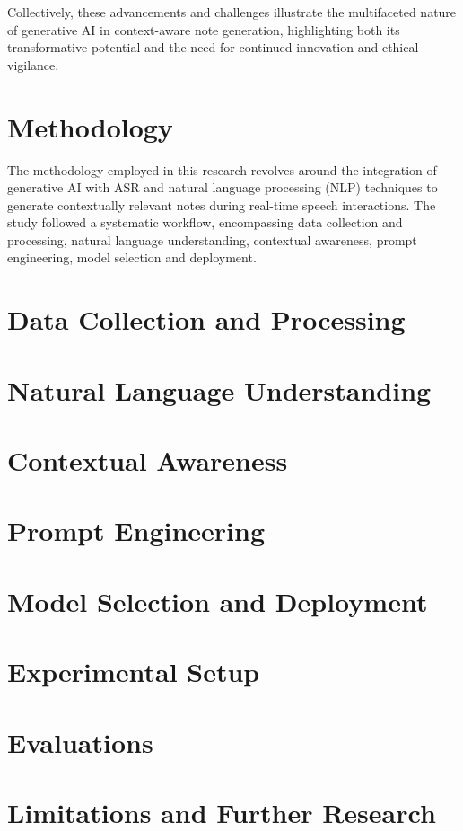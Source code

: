 \documentclass[12pt,a4paper]{article}
\begin{document}
Collectively, these advancements and challenges illustrate the multifaceted
nature of generative AI in context-aware note generation, highlighting both its
transformative potential and the need for continued innovation and ethical
vigilance. 
\newpage

\section {Methodology}

The methodology employed in this research revolves around the integration of
generative AI with ASR and natural language processing (NLP) techniques to
generate contextually relevant notes during real-time speech interactions. The
study followed a systematic workflow, encompassing data collection and
processing, natural language understanding, contextual awareness, prompt
engineering, model selection and deployment.



\section {Data Collection and Processing}

\newpage
\section {Natural Language Understanding}

\newpage
\section {Contextual Awareness}

\newpage
\section {Prompt Engineering}

\newpage
\section {Model Selection and Deployment}

\newpage
\section{Experimental Setup}

\section{Evaluations}

\newpage
\section{Limitations and Further Research}

\newpage
\nocite{*}



\end{document}
